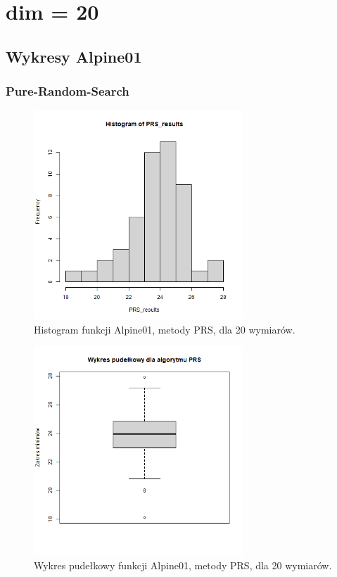 \documentclass{lab}
\begin{document}
\section{dim = 20}
\subsection{Wykresy Alpine01}
\subsubsection{Pure-Random-Search}
\begin{figure}[H]
  \centering
  \includegraphics[width=0.7\textwidth]{img/dim20_PRS_Alpine01_his.png}
  \caption{Histogram funkcji Alpine01, metody PRS, dla 20 wymiarów.}
\end{figure}
\begin{figure}[H]
  \centering
  \includegraphics[width=0.7\textwidth]{img/dim20_PRS_Alpine01.png}
  \caption{Wykres pudełkowy funkcji Alpine01, metody PRS, dla 20 wymiarów.}
\end{figure}
\end{document}
